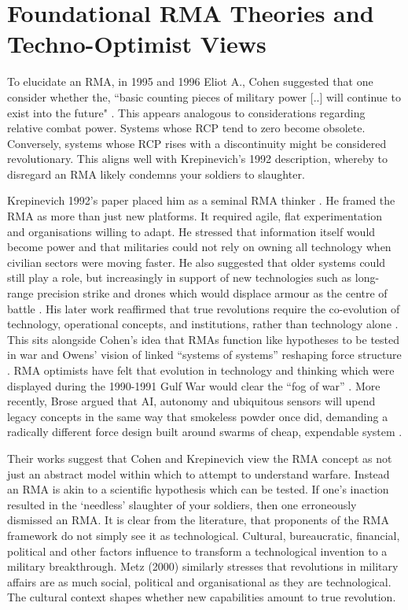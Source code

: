 \section{Foundational RMA Theories and Techno-Optimist Views}

To elucidate an RMA, in 1995 and 1996 Eliot A., Cohen suggested that one consider whether the, ``basic counting pieces of
military power [..] will continue to exist into the future"  \parencite{COHEN_1995}. This appears analogous to considerations regarding relative combat power. Systems whose RCP tend to zero become obsolete. Conversely, systems whose RCP rises with a discontinuity might be considered revolutionary. This aligns well with Krepinevich's 1992 description, whereby to disregard an RMA likely condemns your soldiers to slaughter. 

Krepinevich 1992's paper placed him as a seminal RMA thinker \nocite{KREP_1992}. He framed the RMA as more than just new platforms. It required agile, flat experimentation and organisations willing to adapt. He stressed that information itself would become power and that militaries could not rely on owning all technology when civilian sectors were moving faster. He also suggested that older systems could still play a role, but increasingly in support of new technologies such as long-range precision strike and drones which would displace armour as the centre of battle \nocite{KREP_1992}. His later work reaffirmed that true revolutions require the co-evolution of technology, operational concepts, and institutions, rather than technology alone \parencite{KREP_1994}. This sits alongside Cohen’s idea that RMAs function like hypotheses to be tested in war \parencite{COHEN_1996} and Owens’ vision of linked “systems of systems” reshaping force structure \parencite{OWENS_2002}. RMA optimists have felt that evolution in technology and thinking which were displayed during the 1990-1991 Gulf War would clear the ``fog of war''  \parencite[p.~49]{ALACH_2008}. More recently, Brose argued that AI, autonomy and ubiquitous sensors will upend legacy concepts in the same way that smokeless powder once did, demanding a radically different force design built around swarms of cheap, expendable system \parencite{BROSE_2019}.

Their works suggest that Cohen and Krepinevich view the RMA concept as not just an abstract model within which to attempt to understand warfare. Instead an RMA is akin to a scientific hypothesis which can be tested. If one's inaction resulted in the `needless' slaughter of your soldiers, then one erroneously dismissed an RMA. It is clear from the literature, that proponents of the RMA framework do not simply see it as technological. Cultural, bureaucratic, financial, political and other factors influence to transform a technological invention to a military breakthrough. Metz (2000) similarly stresses that revolutions in military affairs are as much social, political and organisational as they are technological\nocite{METZ_2000}. The cultural context shapes whether new capabilities amount to true revolution.

